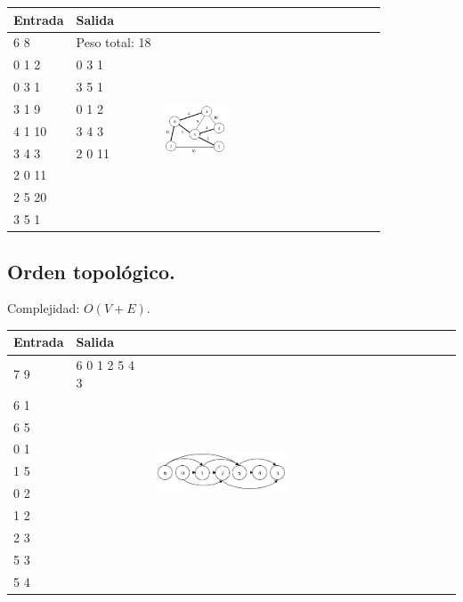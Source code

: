\documentclass[10pt, letterpaper, twoside]{article}
\begin{document}
\begin{tabular}{|p{4cm}|p{4cm}|p{7.5cm}|}
\hline
\textbf{Entrada} & \textbf{Salida} & \\ \hline
6 8    & Peso total: 18 & \multirow{9}{*}{\includegraphics[width = 0.3\textwidth]{Grafos/Imagenes/MST.png}}\\
0 1 2  & 0 3 1  &\\
0 3 1  & 3 5 1  &\\
3 1 9  & 0 1 2  &\\
4 1 10 & 3 4 3  &\\
3 4 3  & 2 0 11 &\\
2 0 11 & & \\
2 5 20 & & \\
3 5 1  & & \\ \hline
\end{tabular}

\subsection{Orden topológico.}

Complejidad: $O(V + E)$.



\begin{tabular}{|p{3.75cm}|p{3.75cm}|p{8cm}|}
\hline
\textbf{Entrada} & \textbf{Salida} & \\ \hline
7 9 & 6 0 1 2 5 4 3 & \multirow{10}{*}{\includegraphics[width = 0.45\textwidth]{Grafos/Imagenes/TopoSort.png}} \\
6 1 & & \\
6 5 & & \\
0 1 & & \\
1 5 & & \\
0 2 & & \\
1 2 & & \\
2 3 & & \\
5 3 & & \\ 
5 4 & & \\ \hline
\end{tabular}
\end{document}
